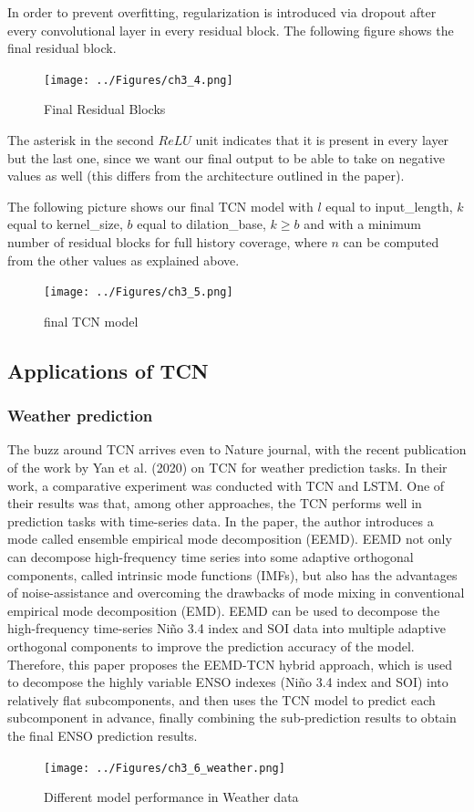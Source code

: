 In order to prevent overfitting, regularization is introduced via dropout after every convolutional layer in every residual block. The following figure shows the final residual block.
\begin{figure}[H]
    \texttt{[image: ../Figures/ch3\_4.png]}
    \caption{Final Residual Blocks}
\end{figure}
The asterisk in the second $ReLU$ unit indicates that it is present in every layer but the last one, since we want our final output to be able to take on negative values as well (this differs from the architecture outlined in the paper).

The following picture shows our final TCN model with $l$ equal to input\_length, $k$ equal to kernel\_size, $b$ equal to dilation\_base, $k\geq b$ and with a minimum number of residual blocks for full history coverage, where $n$ can be computed from the other values as explained above.
\begin{figure}[H]
    \texttt{[image: ../Figures/ch3\_5.png]}
    \caption{final TCN model}
\end{figure}


\subsection{Applications of TCN}

\subsubsection{Weather prediction}
The buzz around TCN arrives even to Nature journal, with the recent publication of the work by Yan et al. (2020) on TCN for weather prediction tasks. In their work, a comparative experiment was conducted with TCN and LSTM. One of their results was that, among other approaches, the TCN performs well in prediction tasks with time-series data.
In the paper, the author introduces a mode called ensemble empirical mode decomposition (EEMD). EEMD not only can decompose high-frequency time series into some adaptive orthogonal components, called intrinsic mode functions (IMFs), but also has the advantages of noise-assistance and overcoming the drawbacks of mode mixing in conventional empirical mode decomposition (EMD). EEMD can be used to decompose the high-frequency time-series Niño 3.4 index and SOI data into multiple adaptive orthogonal components to improve the prediction accuracy of the model. Therefore, this paper proposes the EEMD-TCN hybrid approach, which is used to decompose the highly variable ENSO indexes (Niño 3.4 index and SOI) into relatively flat subcomponents, and then uses the TCN model to predict each subcomponent in advance, finally combining the sub-prediction results to obtain the final ENSO prediction results.
\begin{figure}[H]
    \texttt{[image: ../Figures/ch3\_6\_weather.png]}
    \caption{Different model performance in Weather data}
\end{figure}

